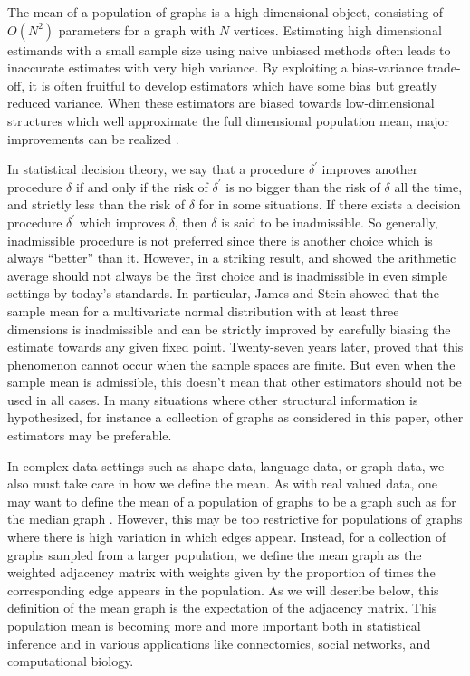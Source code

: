 \documentclass[10pt,letterpaper]{article}
\begin{document}
The mean of a population of graphs is a high dimensional object, consisting of $O(N^2)$ parameters for a graph with $N$ vertices.
Estimating high dimensional estimands with a small sample size using naive unbiased methods often leads to inaccurate estimates with very high variance.
By exploiting a bias-variance trade-off, it is often fruitful to develop estimators which have some bias but greatly reduced variance.
When these estimators are biased towards low-dimensional structures which well approximate the full dimensional population mean, major improvements can be realized \citep{trunk1979problem}.


In statistical decision theory, we say that a procedure $\delta^{\prime}$ improves another procedure $\delta$ if and only if the risk of $\delta^{\prime}$ is no bigger than the risk of $\delta$ all the time, and strictly less than the risk of $\delta$ for in some situations. If there exists a decision procedure $\delta^{\prime}$ which improves $\delta$, then $\delta$ is said to be inadmissible. So generally, inadmissible procedure is not preferred since there is another choice which is always ``better'' than it.
However, in a striking result, \citet{stein1956inadmissibility} and \citet{james1961estimation} showed the arithmetic average should not always be the first choice and is inadmissible in even simple settings by today's standards. 
In particular, James and Stein showed that the sample mean for a multivariate normal distribution with at least three dimensions is inadmissible and can be strictly improved by carefully biasing the  estimate towards any given fixed point. 
Twenty-seven years later, \citet{gutmann1982stein} proved that this phenomenon cannot occur when the sample spaces are finite.
But even when  the sample mean is admissible, this doesn't mean that other estimators should not be used in all cases.
In many situations where other structural information is hypothesized, for instance a collection of graphs as considered in this paper, other estimators may be preferable.

In complex data settings such as shape data, language data, or graph data, we also must take care in how we define the mean.
As with real valued data, one may want to define the mean of a population of graphs to be a graph such as for the median graph \citep{jiang2001median}.
However, this may be too restrictive for populations of graphs where there is high variation in which edges appear. 
Instead, for a collection of graphs sampled from a larger population, we define the mean graph as the weighted adjacency matrix with weights given by the proportion of times the corresponding edge appears in the population. 
As we will describe below, this definition of the mean graph is the expectation of the adjacency matrix.
This population mean is becoming more and more important both in statistical inference and in various applications like connectomics, social networks, and computational biology.
\end{document}
